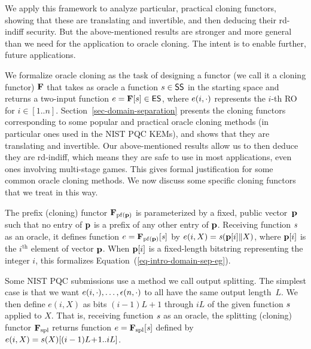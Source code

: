  We apply this framework to analyze particular, practical cloning functors, showing that these are translating and invertible, and then deducing their rd-indiff security. But the above-mentioned results are stronger and more general than we need for the application to oracle cloning. The intent is to enable further, future applications.

  




 We formalize oracle cloning as the task of designing a functor (we call it a cloning functor) $\mathbf{F}$ that takes as oracle a function $s \in \mathsf{SS}$ in the starting space and returns a two-input function $e = \mathbf{F}[s] \in \mathsf{ES} $, where $e(i,\cdot)$ represents the $i$-th RO for $i\in [1..n]$. Section~\ref{sec-domain-separation} presents the cloning functors corresponding to some popular and practical oracle cloning methods (in particular ones used in the NIST PQC KEMs), and shows that they are translating and invertible. Our above-mentioned results allow us to then deduce they are rd-indiff, which means they are safe to use in most applications, even ones involving multi-stage games. This gives formal justification for some common oracle cloning methods. We now discuss some specific cloning functors that we treat in this way.

The prefix (cloning) functor $\mathbf{F}_{\mathrm{pf}(\mathbf{p})}$ is parameterized by a fixed, public vector~$\mathbf{p}$ such that no entry of $\mathbf{p}$ is a prefix of any other entry of $\mathbf{p}$. Receiving function $\mathit{s}$ as an oracle, it defines function $e = \mathbf{F}_{\mathrm{pf}(\mathbf{p})}[\mathit{s}]$ by $e(i,X) \allowbreak = \allowbreak \mathit{s}(\mathbf{p}[i]\|X)$, where $\mathbf{p}[i]$ is the $i^{\text{th}}$ element of vector $\mathbf{p}$. When $\mathbf{p}[i]$ is a fixed-length bitstring representing the integer $i$, this formalizes Equation~(\ref{eq-intro-domain-sep-eg}). 

Some NIST PQC submissions use a method we call output splitting. The simplest case is that we want $e(i,\cdot),\ldots,{\epsilon}(n,\cdot)$ to all have the same output length~$L$. We then define $e(i,X)$ as bits $(i-1)L\!+\!1$ through $iL$ of the given function $s$ applied to $X$. That is, receiving function $\mathit{s}$ as an oracle, the splitting (cloning) functor $\mathbf{F}_{\mathrm{spl}}$ returns function $e = \mathbf{F}_{\mathrm{spl}}[\mathit{s}]$ defined by $e(i,X) \allowbreak = \allowbreak s(X)[(i-1)L\!+\!1 .. iL]$. 

